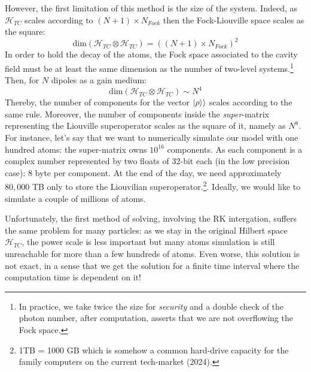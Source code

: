 \documentclass[12pt]{report}
\DeclarePairedDelimiter\kket{\lvert}{\rangle\rangle}
\begin{document}
However, the first limitation of this method is the size of the system. Indeed, as $\mathscr{H}_{TC}$ scales according to $(N+1) \times N_{Fock}$ then the Fock-Liouville space scales as the square:
\begin{equation}
\textrm{dim}\left(\mathscr{H}_{TC} \otimes \mathscr{H}_{TC}\right) = \left((N+1) \times N_{Fock}\right)^2
\end{equation}
In order to hold the decay of the atoms, the Fock space associated to the cavity field must be at least the same dimension as the number of two-level systems.\footnote{In practice, we take twice the size for \textit{security} and a double check of the photon number, after computation, asserts that we are not overflowing the Fock space.} Then, for $N$ dipoles as a gain medium:
\begin{equation}
\textrm{dim}\left(\mathscr{H}_{TC} \otimes \mathscr{H}_{TC}\right) \sim N^4
\end{equation}
Thereby, the number of components for the vector $\kket{\rho}$ scales according to the same rule. Moreover, the number of components inside the \textit{super}-matrix representing the Liouville superoperator scales as the square of it, namely as $N^8$. For instance, let's say that we want to numerically simulate our model with one hundred atoms: the super-matrix owns $10^{16}$ components. As each component is a complex number represented by two floats of 32-bit each (in the low precision case): 8 byte per component. At the end of the day, we need approximately $80,000$ TB only to store the Liouvilian superoperator.\footnote{1TB = 1000 GB which is somehow a common hard-drive capacity for the family computers on the current tech-market (2024).}. Ideally, we would like to simulate a couple of millions of atoms.

Unfortunately, the first method of solving, involving the RK intergation, suffers the same problem for many particles: as we stay in the original Hilbert space $\mathscr{H}_{TC}$, the power scale is less important but many atoms simulation is still unreachable for more than a few hundreds of atoms. Even worse, this solution is not exact, in a sense that we get the solution for a finite time interval where the computation time is dependent on it!
\end{document}
